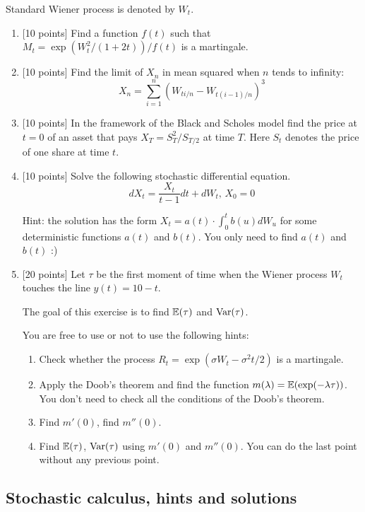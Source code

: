 \documentclass[12pt, a4paper]{article}
\begin{document}
Standard Wiener process is denoted by $W_t$.

\begin{enumerate}
  \item {[10 points]} Find a function $f(t)$ such that $M_t = \exp(W_t^2 / (1+2t)) / f(t)$ is a martingale.
  \item {[10 points]} Find the limit of $X_n$ in mean squared when $n$ tends to infinity:
  \[
  X_n =  \sum_{i=1}^n (W_{ti/n} - W_{t(i-1)/n})^3  
  \]
  
  \item {[10 points]} In the framework of the Black and Scholes model find the price at $t=0$ of an asset 
  that pays $X_T = S_T^2/S_{T/2}$ at time $T$. 
  Here $S_t$ denotes the price of one share at time $t$.

  \item {[10 points]} Solve the following stochastic differential equation.
  \[
  dX_t = \frac{X_t}{t-1} dt +  dW_t, \, X_0 = 0
  \] 
  
  Hint: the solution has the form $X_t = a(t) \cdot \int_0^t b(u) dW_u$ for some deterministic functions $a(t)$ and $b(t)$.
You only need to find $a(t)$ and $b(t)$ :)

  \item {[20 points]} Let $\tau$ be the first moment of time 
  when the Wiener process $W_t$ touches the line $y(t) = 10 - t$. 
  
The goal of this exercise is to find $\operatorname{\mathbb{E}}(\tau)$ and $\operatorname{Var}(\tau)$. 

You are free to use or not to use the following hints:

  \begin{enumerate}
    \item Check whether the process $R_t = \exp(\sigma W_t - \sigma^2 t/2)$ is a martingale. 
    \item Apply the Doob's theorem and find the function $m(\lambda) = \operatorname{\mathbb{E}}(\exp(-\lambda \tau))$. 
    You don't need to check all the conditions of the Doob's theorem. 
    \item Find $m'(0)$, find $m''(0)$.
    \item Find $\operatorname{\mathbb{E}}(\tau)$, $\operatorname{Var}(\tau)$ using $m'(0)$ and $m''(0)$. You can do the last point without any previous point. 
  \end{enumerate}




\end{enumerate}


\subsection{Stochastic calculus, hints and solutions}
\end{document}
